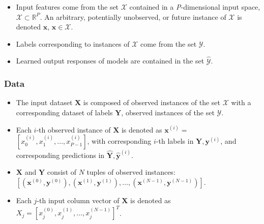 \documentclass[information,article,submit,moreauthors,pdftex]{definitions/mdpi}
\begin{document}
\begin{itemize}[leftmargin=*,labelsep=5.8mm]
	\item Input features come from the set $\mathcal{X}$ contained in a \textit{P}-dimensional input space, $\mathcal{X} \subset \mathbb{R}^P$.  An arbitrary, potentially unobserved, or future instance of $\mathcal{X}$ is denoted $\mathbf{x}$, $\mathbf{x} \in \mathcal{X}$.
	\item Labels corresponding to instances of $\mathcal{X}$ come from the set $\mathcal{Y}$.
	\item Learned output responses of models are contained in the set $\mathcal{\hat{Y}}$. %
\end{itemize}	

\subsubsection{Data} 

\begin{itemize}[leftmargin=*,labelsep=5.8mm]
	\item The input dataset $\mathbf{X}$ is composed of observed instances of the set $\mathcal{X}$ with a corresponding dataset of labels $\mathbf{Y}$, observed instances of the set $\mathcal{Y}$. 
	\item Each $i$-th observed instance of $\mathbf{X}$ is denoted as $\mathbf{x}^{(i)} = $  
	$[x_0^{(i)}, x_1^{(i)}, \dots, x_{\textit{P}-1}^{(i)}]$, with corresponding $i$-th labels in $\mathbf{Y}, \mathbf{y}^{(i)}$, and corresponding predictions in $\mathbf{\hat{Y}}, \mathbf{\hat{y}}^{(i)}$. %
	\item $\mathbf{X}$ and $\mathbf{Y}$ consist of $N$ tuples of observed instances: $[(\mathbf{x}^{(0)},\mathbf{y}^{(0)}), (\mathbf{x}^{(1)},\mathbf{y}^{(1)}), \dots,(\mathbf{x}^{(N-1)},\mathbf{y}^{(N-1)})]$. %
	\item Each $j$-th input column vector of $\mathbf{X}$ is denoted as $X_j = [x_{j}^{(0)}, x_{j}^{(1)}, \dots, x_{j}^{(N-1)}]^T$.
\end{itemize}	 
\end{document}
